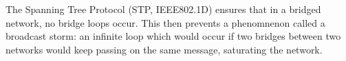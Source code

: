 The Spanning Tree Protocol (STP, IEEE802.1D) ensures that in a bridged network, no bridge loops occur. This then prevents a phenomnenon called a broadcast storm: an infinite loop which would occur if two bridges between two networks would keep passing on the same message, saturating the network.